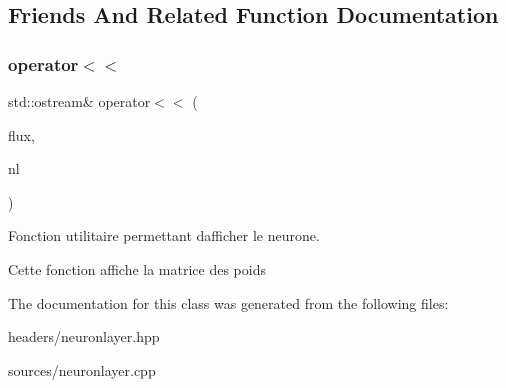 \subsection{Friends And Related Function Documentation}
\mbox{\label{classNeuronLayer_adbe40702c22550c0392b3447e5d63c9a}} 
\subsubsection{\texorpdfstring{operator$<$$<$}{operator<<}}
{\footnotesize\ttfamily std\+::ostream\& operator$<$$<$ (\begin{DoxyParamCaption}\item[{std\+::ostream \&}]{flux,  }\item[{\hyperlink{classNeuronLayer}{Neuron\+Layer}}]{nl }\end{DoxyParamCaption})\hspace{0.3cm}{\ttfamily [friend]}}



Fonction utilitaire permettant d\textquotesingle{}afficher le neurone. 

Cette fonction affiche la matrice des poids 

The documentation for this class was generated from the following files\+:\begin{DoxyCompactItemize}
\item 
headers/neuronlayer.\+hpp\item 
sources/neuronlayer.\+cpp\end{DoxyCompactItemize}
